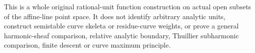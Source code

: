 \begin{remark}
This is a whole original rational-unit function construction on actual
open subsets of the affine-line point space. It does not identify arbitrary
analytic units, construct semistable curve skeleta or residue-curve weights,
or prove a general harmonic-sheaf comparison, relative analytic boundary,
Thuillier subharmonic comparison, finite descent or curve maximum principle.
\end{remark}
